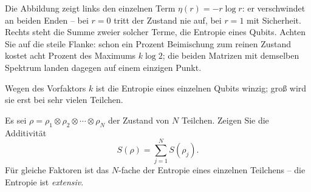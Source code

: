 

Die Abbildung zeigt links den einzelnen Term $\eta(r)=-r\log r$: er verschwindet
an beiden Enden -- bei $r=0$ tritt der Zustand nie auf, bei $r=1$ mit Sicherheit.
Rechts steht die Summe zweier solcher Terme, die Entropie eines Qubits. Achten Sie
auf die steile Flanke: schon ein Prozent Beimischung zum reinen Zustand kostet acht
Prozent des Maximums $k\log 2$; die beiden Matrizen mit demselben Spektrum landen
dagegen auf einem einzigen Punkt.

Wegen des Vorfaktors $k$ ist die Entropie eines einzelnen Qubits winzig; groß wird sie erst bei sehr vielen Teilchen.

\begin{übung}\label{ex:entropie-additiv}
	Es sei $\rho = \rho_1\otimes\rho_2\otimes\cdots\otimes\rho_N$ der Zustand von $N$ Teilchen. Zeigen Sie die Additivität
	\begin{equation}
		S(\rho) = \sum_{j=1}^N S(\rho_j).
	\end{equation}
	Für gleiche Faktoren ist das $N$-fache der Entropie eines einzelnen Teilchens -- die Entropie ist \emph{extensiv}.
\end{übung}